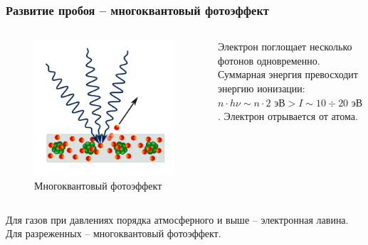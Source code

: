 \documentclass{beamer}
\begin{document}
	\begin{frame}
		\frametitle{Развитие пробоя -- многоквантовый фотоэффект}
		
		\begin{columns}
			\begin{figure}
				\centering
				\includegraphics[width=0.8\linewidth]{res/multiphoton.png}
				\caption*{Многоквантовый фотоэффект}
			\end{figure}
		
			Электрон поглощает несколько фотонов одновременно. Суммарная энергия превосходит энергию ионизации: $n \cdot h\nu \sim n \cdot 2 \text{ эВ} > I \sim 10 \div 20 \text{ эВ}$. Электрон отрывается от атома.
		\end{columns}
	
		Для газов при давлениях порядка атмосферного и выше -- электронная лавина.
		Для разреженных -- многоквантовый фотоэффект.
	\end{frame}
	
\end{document}
